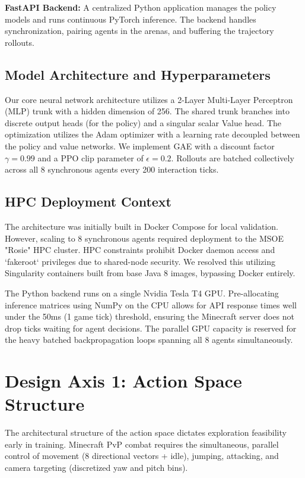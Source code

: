 \documentclass[conference]{IEEEtran}
\begin{document}
\textbf{FastAPI Backend:} A centralized Python application manages the policy models and runs continuous PyTorch inference. The backend handles synchronization, pairing agents in the arenas, and buffering the trajectory rollouts. 

\subsection{Model Architecture and Hyperparameters}
Our core neural network architecture utilizes a 2-Layer Multi-Layer Perceptron (MLP) trunk with a hidden dimension of 256. The shared trunk branches into discrete output heads (for the policy) and a singular scalar Value head. The optimization utilizes the Adam optimizer with a learning rate decoupled between the policy and value networks. We implement GAE with a discount factor $\gamma = 0.99$ and a PPO clip parameter of $\epsilon = 0.2$. Rollouts are batched collectively across all 8 synchronous agents every 200 interaction ticks.

\subsection{HPC Deployment Context}
The architecture was initially built in Docker Compose for local validation. However, scaling to 8 synchronous agents required deployment to the MSOE "Rosie" HPC cluster. HPC constraints prohibit Docker daemon access and `fakeroot` privileges due to shared-node security. We resolved this utilizing Singularity containers built from base Java 8 images, bypassing Docker entirely. 

The Python backend runs on a single Nvidia Tesla T4 GPU. Pre-allocating inference matrices using NumPy on the CPU allows for API response times well under the 50ms (1 game tick) threshold, ensuring the Minecraft server does not drop ticks waiting for agent decisions. The parallel GPU capacity is reserved for the heavy batched backpropagation loops spanning all 8 agents simultaneously.

\section{Design Axis 1: Action Space Structure}
The architectural structure of the action space dictates exploration feasibility early in training. Minecraft PvP combat requires the simultaneous, parallel control of movement (8 directional vectors + idle), jumping, attacking, and camera targeting (discretized yaw and pitch bins). 
\end{document}
